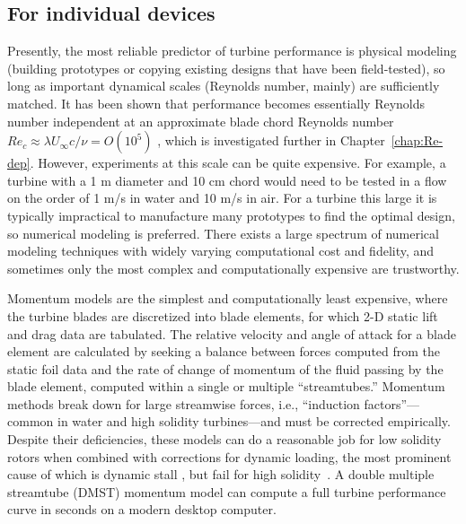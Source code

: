 \subsection{For individual devices}

Presently, the most reliable predictor of turbine performance is physical
modeling (building prototypes or copying existing designs that have been
field-tested), so long as important dynamical scales (Reynolds number, mainly)
are sufficiently matched. It has been shown that performance becomes essentially
Reynolds number independent at an approximate blade chord Reynolds number $Re_c
\approx \lambda U_\infty c / \nu = O(10^5)$ \cite{Bravo2007}, which is
investigated further in Chapter~\ref{chap:Re-dep}. However, experiments at this
scale can be quite expensive. For example, a turbine with a 1 m diameter and 10
cm chord would need to be tested in a flow on the order of 1 m/s in water and 10
m/s in air. For a turbine this large it is typically impractical to manufacture
many prototypes to find the optimal design, so numerical modeling is preferred.
There exists a large spectrum of numerical modeling techniques with widely
varying computational cost and fidelity, and sometimes only the most complex and
computationally expensive are trustworthy.


Momentum models are the simplest and computationally least expensive, where the
turbine blades are discretized into blade elements, for which 2-D static lift
and drag data are tabulated. The relative velocity and angle of attack for a
blade element are calculated by seeking a balance between forces computed from
the static foil data and the rate of change of momentum of the fluid passing by
the blade element, computed within a single or multiple ``streamtubes.''
Momentum methods break down for large streamwise forces, i.e., ``induction
factors''---common in water and high solidity turbines---and must be corrected
empirically. Despite their deficiencies, these models can do a reasonable job
for low solidity rotors when combined with corrections for dynamic loading, the
most prominent cause of which is dynamic stall \cite{Para2002}, but fail for
high solidity~\cite{Joo2015}. A double multiple streamtube (DMST) momentum model
can compute a full turbine performance curve in seconds on a modern desktop
computer.


